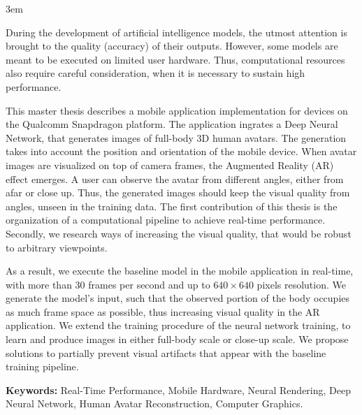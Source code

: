 \emergencystretch 3em

\par
During the development of artificial intelligence models, the utmost attention is brought to the quality (accuracy) of their outputs. However, some models are meant to be executed on limited user hardware. Thus, computational resources also require careful consideration, when it is necessary to sustain high performance.

\par
This master thesis describes a mobile application implementation for devices on the Qualcomm Snapdragon platform. The application ingrates a Deep Neural Network, that generates images of full-body 3D human avatars. The generation takes into account the position and orientation of the mobile device. When avatar images are visualized on top of camera frames, the Augmented Reality (AR) effect emerges. A user can observe the avatar from different angles, either from afar or close up. Thus, the generated images should keep the visual quality from angles, unseen in the training data. The first contribution of this thesis is the organization of a computational pipeline to achieve real-time performance. Secondly, we research ways of increasing the visual quality, that would be robust to arbitrary viewpoints.

\par
As a result, we execute the baseline model \cite{dnn:stylepeople21} in the mobile application in real-time, with more than 30 frames per second and up to $640\times640$ pixels resolution. We generate the model's input, such that the observed portion of the body occupies as much frame space as possible, thus increasing visual quality in the AR application. We extend the training procedure of the neural network training, to learn and produce images in either full-body scale or close-up scale. We propose solutions to partially prevent visual artifacts that appear with the baseline training pipeline. 

\par
\textbf{Keywords:} Real-Time Performance, Mobile Hardware, Neural Rendering, Deep Neural Network, Human Avatar Reconstruction, Computer Graphics.  
